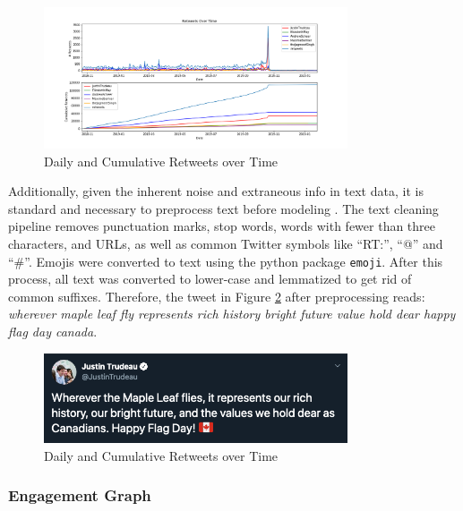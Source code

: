 \begin{figure}[h!]
  \centering
  \includegraphics[width=0.8\textwidth]{figures/retweets_over_time}
  \caption[Daily and Cumulative Retweets over Time]{Daily and Cumulative Retweets over Time}
  \label{fig:retweets_over_time}
\end{figure}

Additionally, given the inherent noise and extraneous info in text data, it is
standard and necessary to preprocess text before modeling
\cite{sapul2017trending}. The text cleaning pipeline removes punctuation marks,
stop words, words with fewer than three characters, and URLs, as well as common
Twitter symbols like ``RT:'', ``@'' and ``\#''. Emojis were converted to text
using the python package \texttt{emoji}. After this process, all text was
converted to lower-case and lemmatized to get rid of common suffixes. Therefore,
the tweet in Figure \ref{fig:tweet_ex} after preprocessing reads: \emph{wherever
maple leaf fly represents rich history bright future value hold dear happy flag
day canada}.

\begin{figure}[h!]
  \centering
  \includegraphics[width=0.8\textwidth]{figures/tweet_ex}
  \caption[Daily and Cumulative Retweets over Time]{Daily and Cumulative Retweets over Time}
  \label{fig:tweet_ex}
\end{figure}

\subsubsection{Engagement Graph}

